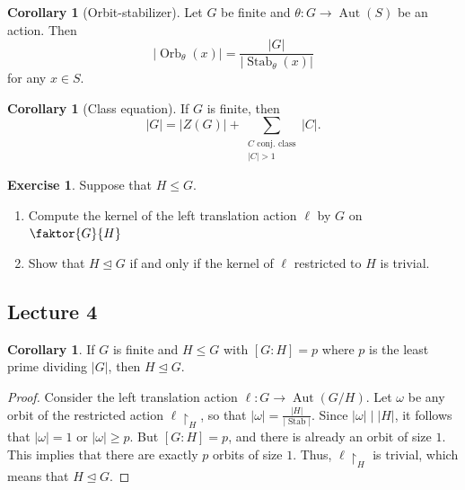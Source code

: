 \documentclass[10pt,letterpaper,cm]{nupset}
\theoremstyle{definition}
\theoremstyle{theorem}
\newtheorem{corollary}[definition]{Corollary}
\newtheorem{exercise}[definition]{Exercise}
\theoremstyle{remark}
\newcommand{\1}{\mathbf{1}}
\newcommand{\0}{\vec 0}
\DeclareMathOperator{\aut}{Aut}
\DeclareMathOperator{\stab}{Stab}
\DeclareMathOperator{\orb}{Orb}
\begin{document}
\begin{corollary}[Orbit-stabilizer]
Let $G$ be  finite  and $\theta : G \to \aut(S)$ be an action. Then $$ \left\lvert{\orb_{\theta}(x)}\right\rvert = \frac{\left\lvert{G}\right\rvert}{\left\lvert{\stab_{\theta}(x)}\right\rvert}     $$ for any $x\in S$. 
\end{corollary}

\begin{corollary}[Class equation]
If $G$ is finite, then $$\left\lvert{G}\right\rvert = \left\lvert{Z(G)}\right\rvert + \sum_{{\substack{C \text{ conj. class} \\ \left\lvert{C}\right\rvert >1}}} \left\lvert{C}\right\rvert     .$$
\end{corollary}

\begin{exercise}{Suppose that $H \leq G$.}
\begin{enumerate}
\item Compute the kernel of the left translation action $\ell$ by $G$ on $\faktor{G}{H}$
\item Show that $H \unlhd G$  if and only if the kernel of $\ell$ restricted to $H$ is trivial. 
\end{enumerate}
\end{exercise}

\subsection{Lecture 4}

\begin{corollary} If $G$ is finite and $H\leq G$ with $[G:H] =p$ where $p$ is the least prime dividing $\left\lvert{G}\right\rvert$, then $H\unlhd G$.
\end{corollary}
\begin{proof}
Consider the left translation action $\ell : G \to \aut(G/H)$. Let $\omega$ be any orbit of the restricted action $\ell\restriction_H$, so that $\left\lvert{\omega}\right\rvert = \frac{\left\lvert{H}\right\rvert}{\left\lvert{\stab}\right\rvert}$. Since $\left\lvert{\omega}\right\rvert \mid \left\lvert{H}\right\rvert$, it follows that $\left\lvert{\omega}\right\rvert=1$ or $\left\lvert{\omega}\right\rvert \geq p$. But $[G:H] = p$, and there is already an orbit of size $1$. This implies that there are exactly $p$ orbits of size $1$. Thus, $\ell\restriction_H$ is trivial, which means that $H \unlhd G$.
\end{proof}

\smallskip
\end{document}
